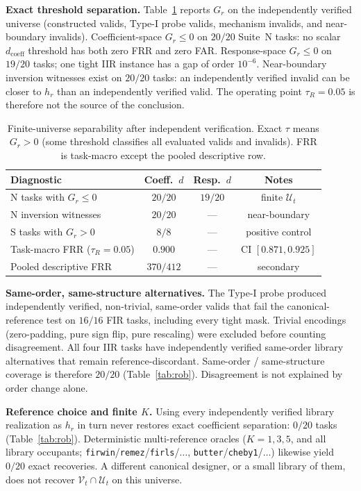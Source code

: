 \documentclass{article}
\begin{document}
\noindent\textbf{Exact threshold separation.}
Table~\ref{tab:sep} reports $G_r$ on the independently verified
universe (constructed valids, Type-I probe valids, mechanism
invalids, and near-boundary invalids).
Coefficient-space $G_r\le 0$ on $20/20$ Suite~N tasks: no scalar
$d_{\mathrm{coeff}}$ threshold has both zero FRR and zero FAR.
Response-space $G_r\le 0$ on $19/20$ tasks; one tight IIR instance
has a gap of order $10^{-6}$.
Near-boundary inversion witnesses exist on $20/20$ tasks: an
independently verified invalid can be closer to $h_r$ than an
independently verified valid.
The operating point $\tau_R=0.05$ is therefore not the source of the
conclusion.

\begin{table}[t]
\caption{Finite-universe separability after independent
verification.
Exact $\tau$ means $G_r>0$ (some threshold classifies all evaluated
valids and invalids).
FRR is task-macro except the pooled descriptive row.}
\label{tab:sep}
\centering
\footnotesize
\setlength{\tabcolsep}{2.4pt}
\begin{tabular}{@{}lccc@{}}
\hline
Diagnostic & Coeff.\ $d$ & Resp.\ $d$ & Notes \\
\hline
N tasks with $G_r\le 0$ & $20/20$ & $19/20$ & finite $\mathcal{U}_t$ \\
N inversion witnesses & $20/20$ & --- & near-boundary \\
S tasks with $G_r>0$ & $8/8$ & --- & positive control \\
Task-macro FRR ($\tau_R=0.05$) & $0.900$ & --- & CI $[0.871,0.925]$ \\
Pooled descriptive FRR & $370/412$ & --- & secondary \\
\hline
\end{tabular}
\end{table}

\noindent\textbf{Same-order, same-structure alternatives.}
The Type-I probe produced independently verified, non-trivial,
same-order valids that fail the canonical-reference test on
$16/16$ FIR tasks, including every tight mask.
Trivial encodings (zero-padding, pure sign flip, pure rescaling)
were excluded before counting disagreement.
All four IIR tasks have independently verified same-order library
alternatives that remain reference-discordant.
Same-order / same-structure coverage is therefore $20/20$
(Table~\ref{tab:rob}).
Disagreement is not explained by order change alone.

\noindent\textbf{Reference choice and finite $K$.}
Using every independently verified library realization as $h_r$ in
turn never restores exact coefficient separation: $0/20$ tasks
(Table~\ref{tab:rob}).
Deterministic multi-reference oracles
($K=1,3,5$, and all library occupants;
\texttt{firwin}/\texttt{remez}/\texttt{firls}/$\ldots$,
\texttt{butter}/\texttt{cheby1}/$\ldots$) likewise yield $0/20$
exact recoveries.
A different canonical designer, or a small library of them, does not
recover $\mathcal{V}_t\cap\mathcal{U}_t$ on this universe.
\end{document}
